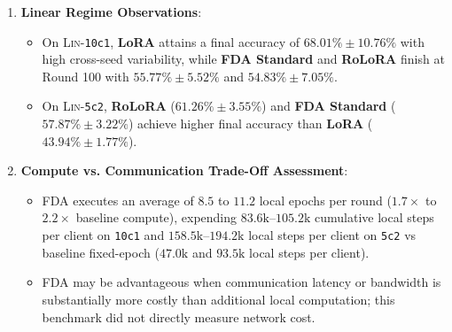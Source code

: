 \documentclass[10pt,a4paper]{article}
\begin{document}
\begin{enumerate}
    \item \textbf{Linear Regime Observations}:
    \begin{itemize}
        \item On \textsc{Lin}-\texttt{10c1}, \textbf{LoRA} attains a final accuracy of $68.01\% \pm 10.76\%$ with high cross-seed variability, while \textbf{FDA Standard} and \textbf{RoLoRA} finish at Round 100 with $55.77\% \pm 5.52\%$ and $54.83\% \pm 7.05\%$.
        \item On \textsc{Lin}-\texttt{5c2}, \textbf{RoLoRA} ($61.26\% \pm 3.55\%$) and \textbf{FDA Standard} ($57.87\% \pm 3.22\%$) achieve higher final accuracy than \textbf{LoRA} ($43.94\% \pm 1.77\%$).
    \end{itemize}

    \item \textbf{Compute vs. Communication Trade-Off Assessment}:
    \begin{itemize}
        \item FDA executes an average of $8.5$ to $11.2$ local epochs per round ($1.7\times$ to $2.2\times$ baseline compute), expending $83.6\text{k}$--$105.2\text{k}$ cumulative local steps per client on \texttt{10c1} and $158.5\text{k}$--$194.2\text{k}$ local steps per client on \texttt{5c2} vs baseline fixed-epoch ($47.0\text{k}$ and $93.5\text{k}$ local steps per client).
        \item FDA may be advantageous when communication latency or bandwidth is substantially more costly than additional local computation; this benchmark did not directly measure network cost.
    \end{itemize}
\end{enumerate}
\end{document}
